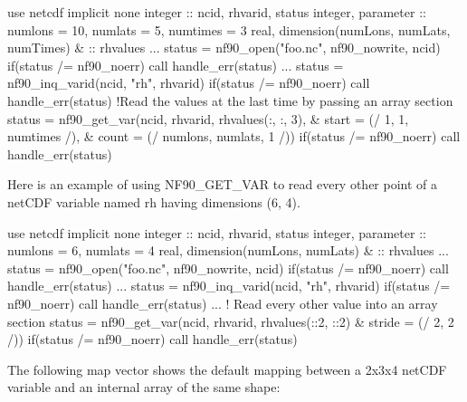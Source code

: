 \begin{DoxyCode}
\textcolor{keywordtype}{use }netcdf
\textcolor{keywordtype}{implicit none}
\textcolor{keywordtype}{integer}            :: ncid, rhvarid, status
\textcolor{keywordtype}{integer}, \textcolor{keywordtype}{parameter} :: numlons = 10, numlats = 5, numtimes = 3
\textcolor{keywordtype}{real}, \textcolor{keywordtype}{dimension(numLons, numLats, numTimes)} &
                   :: rhvalues
...
status = nf90\_open(\textcolor{stringliteral}{"foo.nc"}, nf90\_nowrite, ncid)
\textcolor{keywordflow}{if}(status /= nf90\_noerr) \textcolor{keyword}{call }handle\_err(status)
...
status = nf90\_inq\_varid(ncid, \textcolor{stringliteral}{"rh"}, rhvarid)
\textcolor{keywordflow}{if}(status /= nf90\_noerr) \textcolor{keyword}{call }handle\_err(status)
\textcolor{comment}{!Read the values at the last time by passing an array section}
status = nf90\_get\_var(ncid, rhvarid, rhvalues(:, :, 3), &
                      start = (/ 1, 1, numtimes /),     &
                      count = (/ numlons, numlats, 1 /))
\textcolor{keywordflow}{if}(status /= nf90\_noerr) \textcolor{keyword}{call }handle\_err(status)
\end{DoxyCode}


Here is an example of using N\+F90\+\_\+\+G\+E\+T\+\_\+\+V\+AR to read every other point of a net\+C\+DF variable named rh having dimensions (6, 4).


\begin{DoxyCode}
\textcolor{keywordtype}{use }netcdf
\textcolor{keywordtype}{implicit none}
\textcolor{keywordtype}{integer}            :: ncid, rhvarid, status
\textcolor{keywordtype}{integer}, \textcolor{keywordtype}{parameter} :: numlons = 6, numlats = 4
\textcolor{keywordtype}{real}, \textcolor{keywordtype}{dimension(numLons, numLats)} &
                   :: rhvalues
...
status = nf90\_open(\textcolor{stringliteral}{"foo.nc"}, nf90\_nowrite, ncid)
\textcolor{keywordflow}{if}(status /= nf90\_noerr) \textcolor{keyword}{call }handle\_err(status)
...
status = nf90\_inq\_varid(ncid, \textcolor{stringliteral}{"rh"}, rhvarid)
\textcolor{keywordflow}{if}(status /= nf90\_noerr) \textcolor{keyword}{call }handle\_err(status)
...
\textcolor{comment}{! Read every other value into an array section}
status = nf90\_get\_var(ncid, rhvarid, rhvalues(::2, ::2) &
                      stride = (/ 2, 2 /))
\textcolor{keywordflow}{if}(status /= nf90\_noerr) \textcolor{keyword}{call }handle\_err(status)
\end{DoxyCode}


The following map vector shows the default mapping between a 2x3x4 net\+C\+DF variable and an internal array of the same shape\+:


